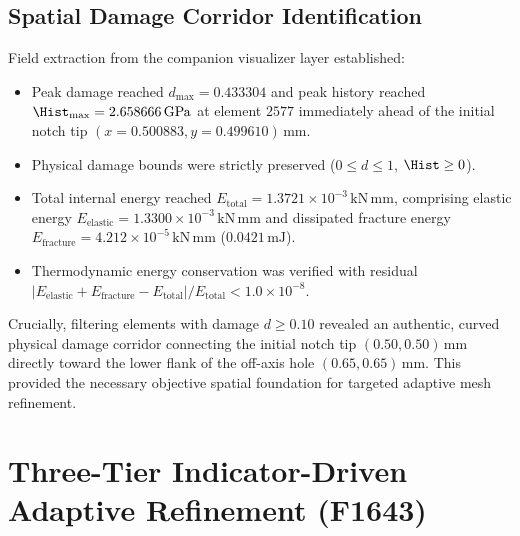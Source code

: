 \subsection{Spatial Damage Corridor Identification}
\label{subsec:pilot_corridor}

Field extraction from the companion visualizer layer established:
\begin{itemize}
  \item Peak damage reached $d_{\max} = 0.433304$ and peak history reached $\Hist_{\max} = 2.658666\,\mathrm{GPa}$ at element $2577$ immediately ahead of the initial notch tip $(x=0.500883, y=0.499610)\,\mathrm{mm}$.
  \item Physical damage bounds were strictly preserved ($0 \le d \le 1$, $\Hist \ge 0$).
  \item Total internal energy reached $E_{\mathrm{total}} = 1.3721 \times 10^{-3}\,\mathrm{kN\,mm}$, comprising elastic energy $E_{\mathrm{elastic}} = 1.3300 \times 10^{-3}\,\mathrm{kN\,mm}$ and dissipated fracture energy $E_{\mathrm{fracture}} = 4.212 \times 10^{-5}\,\mathrm{kN\,mm}$ ($0.0421\,\mathrm{mJ}$).
  \item Thermodynamic energy conservation was verified with residual $|E_{\mathrm{elastic}} + E_{\mathrm{fracture}} - E_{\mathrm{total}}| / E_{\mathrm{total}} < 1.0 \times 10^{-8}$.
\end{itemize}

Crucially, filtering elements with damage $d \ge 0.10$ revealed an authentic, curved physical damage corridor connecting the initial notch tip $(0.50, 0.50)\,\mathrm{mm}$ directly toward the lower flank of the off-axis hole $(0.65, 0.65)\,\mathrm{mm}$. This provided the necessary objective spatial foundation for targeted adaptive mesh refinement.

\section{Three-Tier Indicator-Driven Adaptive Refinement (F1643)}
\label{sec:hole_adaptive_mesh}

